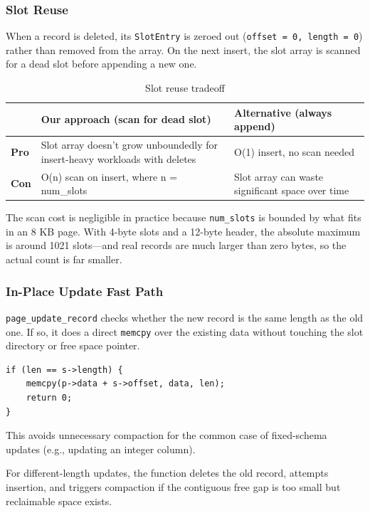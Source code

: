 \documentclass[12pt, a4paper]{report}
\begin{document}
\subsubsection{Slot Reuse}

When a record is deleted, its \texttt{SlotEntry} is zeroed out
(\texttt{offset = 0, length = 0}) rather than removed from the array. On the
next insert, the slot array is scanned for a dead slot before appending a new
one.

\begin{table}[h]
\centering
\begin{tabularx}{\textwidth}{lXX}
\toprule
& \textbf{Our approach (scan for dead slot)} & \textbf{Alternative (always append)} \\
\midrule
\textbf{Pro} &
    Slot array doesn't grow unboundedly for insert-heavy workloads with deletes &
    O(1) insert, no scan needed \\
\addlinespace
\textbf{Con} &
    O(n) scan on insert, where n = num\_slots &
    Slot array can waste significant space over time \\
\bottomrule
\end{tabularx}
\caption{Slot reuse tradeoff}
\end{table}

The scan cost is negligible in practice because \texttt{num\_slots} is bounded
by what fits in an 8 KB page. With 4-byte slots and a 12-byte header, the
absolute maximum is around 1021 slots---and real records are much larger than
zero bytes, so the actual count is far smaller.


\subsubsection{In-Place Update Fast Path}

\texttt{page\_update\_record} checks whether the new record is the same length
as the old one. If so, it does a direct \texttt{memcpy} over the existing data
without touching the slot directory or free space pointer.

\begin{lstlisting}
if (len == s->length) {
    memcpy(p->data + s->offset, data, len);
    return 0;
}
\end{lstlisting}

This avoids unnecessary compaction for the common case of fixed-schema updates
(e.g., updating an integer column).

For different-length updates, the function deletes the old record, attempts
insertion, and triggers compaction if the contiguous free gap is too small but
reclaimable space exists.
\end{document}
